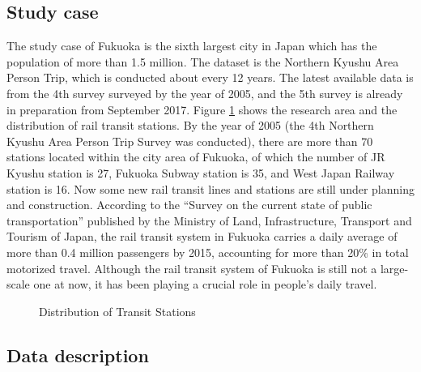 \documentclass[sustainability,article,submit,moreauthors,pdftex,10pt,a4paper]{Definitions/mdpi}
\begin{document}
\subsection{Study case}
The study case of Fukuoka is the sixth largest city in Japan which has the population of more than 1.5 million. The dataset is the Northern Kyushu Area Person Trip, which is conducted about every 12 years. The latest available data is from the 4th survey surveyed by the year of 2005, and the 5th survey is already in preparation from September 2017. Figure \ref{fig:StationDistribution} shows the research area and the distribution of rail transit stations. By the year of 2005 (the 4th Northern Kyushu Area Person Trip Survey was conducted), there are more than 70 stations located within the city area of Fukuoka, of which the number of JR Kyushu station is 27, Fukuoka Subway station is 35, and West Japan Railway station is 16. Now some new rail transit lines and stations are still under planning and construction. According to the “Survey on the current state of public transportation” published by the Ministry of Land, Infrastructure, Transport and Tourism of Japan, the rail transit system in Fukuoka carries a daily average of more than 0.4 million passengers by 2015, accounting for more than 20\% in total motorized travel. Although the rail transit system of Fukuoka is still not a large-scale one at now, it has been playing a crucial role in people's daily travel.

%
\begin{figure}[h]
	\caption{Distribution of Transit Stations}
	\label{fig:StationDistribution}
	\centering
\end{figure}

%
\subsection{Data description}
\end{document}
